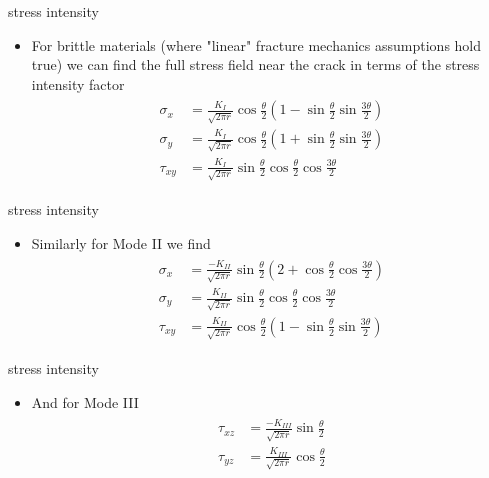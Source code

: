 \documentclass[10pt]{beamer}
\begin{document}
\begin{frame}{stress intensity}
	\begin{itemize}
		\item For brittle materials (where "linear" fracture mechanics assumptions hold true) we can find the full stress field near the crack in terms of the stress intensity factor
		\begin{align}
		\begin{split}
		\sigma_x &= \frac{K_I}{\sqrt{2\pi r}} \cos \frac{\theta}{2} \left(1-\sin \frac{\theta}{2}\sin \frac{3\theta}{2}\right)\\
		\sigma_y &= \frac{K_I}{\sqrt{2\pi r}} \cos \frac{\theta}{2} \left(1+\sin \frac{\theta}{2}\sin \frac{3\theta}{2}\right)\\
		\tau_{xy} &= \frac{K_I}{\sqrt{2\pi r}} \sin \frac{\theta}{2} \cos \frac{\theta}{2}\cos \frac{3\theta}{2}
		\end{split}
		\end{align}
	\end{itemize}
\end{frame}

\begin{frame}{stress intensity}
	\begin{itemize}
		\item Similarly for Mode II we find
		\begin{align}
		\begin{split}
		\sigma_x &= \frac{-K_{II}}{\sqrt{2\pi r}} \sin \frac{\theta}{2} \left(2+\cos \frac{\theta}{2}\cos \frac{3\theta}{2}\right)\\
		\sigma_y &= \frac{K_{II}}{\sqrt{2\pi r}} \sin \frac{\theta}{2} \cos \frac{\theta}{2}\cos \frac{3\theta}{2}\\
		\tau_{xy} &= \frac{K_{II}}{\sqrt{2\pi r}} \cos \frac{\theta}{2} \left(1-\sin \frac{\theta}{2}\sin \frac{3\theta}{2}\right)
		\end{split}
		\end{align}
	\end{itemize}
\end{frame}

\begin{frame}{stress intensity}
	\begin{itemize}
		\item And for Mode III
		\begin{align}
		\begin{split}
		\tau_{xz} &= \frac{-K_{III}}{\sqrt{2\pi r}} \sin \frac{\theta}{2} \\
		\tau_{yz} &= \frac{K_{III}}{\sqrt{2\pi r}} \cos \frac{\theta}{2} 
		\end{split}
		\end{align}
	\end{itemize}
\end{frame}
\end{document}
